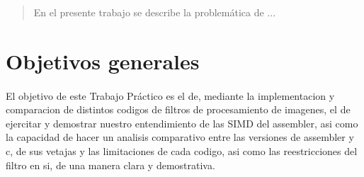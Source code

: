 \documentclass[a4paper]{article}
\begin{document}
\thispagestyle{empty}

\newpage

\thispagestyle{empty}
\vfill
\begin{abstract}
En el presente trabajo se describe la problemática de ...
\end{abstract}

\thispagestyle{empty}
\vspace{3cm}
\tableofcontents
\newpage


\newpage

\section{Objetivos generales}
\paragraph{}
El objetivo de este Trabajo Práctico es el de, mediante la implementacion y comparacion de distintos codigos de filtros de procesamiento de imagenes,  el de   ejercitar y demostrar nuestro entendimiento de las SIMD del assembler, asi como la capacidad de hacer un analisis comparativo entre las versiones de assembler y c, de sus vetajas y las limitaciones de cada  codigo, asi como las reestricciones del filtro en si, de una manera clara y demostrativa. 




	
	


\end{document}
